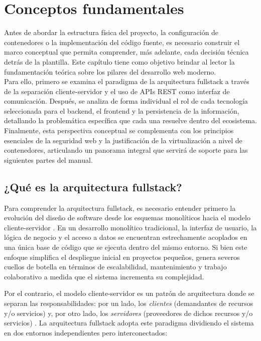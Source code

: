 \chapter{Conceptos fundamentales}	
	Antes de abordar la estructura f\'isica del proyecto, la configuraci\'on de contenedores o la implementaci\'on del c\'odigo fuente, es necesario construir el marco conceptual que permita comprender, m\'as adelante, cada decisi\'on t\'ecnica detr\'as de la plantilla. Este cap\'itulo tiene como objetivo brindar al lector la fundamentaci\'on te\'orica sobre los pilares del desarrollo web moderno. \\
	
	Para ello, primero se examina el paradigma de la arquitectura fullstack a trav\'es de la separaci\'on cliente-servidor y el uso de APIs REST como interfaz de comunicaci\'on. Despu\'es, se analiza de forma individual el rol de cada tecnolog\'ia seleccionada para el backend, el frontend y la persistencia de la informaci\'on, detallando la problem\'atica espec\'ifica que cada una resuelve dentro del ecosistema. Finalmente, esta perspectiva conceptual se complementa con los principios esenciales de la seguridad web y la justificaci\'on de la virtualizaci\'on a nivel de contenedores, articulando un panorama integral que servir\'a de soporte para las siguientes partes del manual.
	
	\section{¿Qué es la arquitectura fullstack?}
	Para comprender la arquitectura fullstack, es necesario entender primero la evoluci\'on del diseño de software desde los esquemas monol\'iticos hacia el modelo cliente-servidor \cite{mdn-clientserver}. En un desarrollo monol\'itico tradicional, la interfaz de usuario, la l\'ogica de negocio y el acceso a datos se encuentran estrechamente acoplados en una \'unica base de c\'odigo que se ejecuta dentro del mismo entorno. Si bien este enfoque simplifica el despliegue inicial en proyectos pequeños, genera severos cuellos de botella en t\'erminos de escalabilidad, mantenimiento y trabajo colaborativo a medida que el sistema incrementa su complejidad.
	
	\newpage
	
	Por el contrario, el modelo cliente-servidor es un patr\'on de arquitectura donde se separan las responsabilidades: por un lado, los \textit{clientes} (demandantes de recursos y/o servicios) y, por otro lado, los \textit{servidores} (proveedores de dichos recursos y/o servicios) \cite{mdn-clientserver}. La arquitectura fullstack adopta este paradigma dividiendo el sistema en dos entornos independientes pero interconectados:
		
